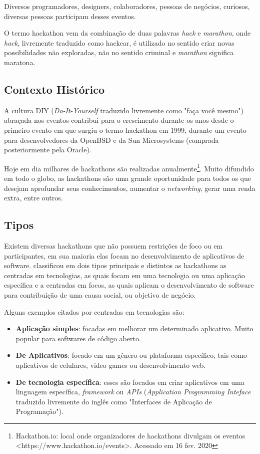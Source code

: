 Diversos programadores, designers, colaboradores, pessoas de negócios, curiosos, diversas pessoas participam desses eventos. 


O termo hackathon vem da combinação de duas palavras \textit{hack} e \textit{marathon}, onde \textit{hack}, livremente traduzido como hackear, é utilizado no sentido  criar novas possibilidades não exploradas, não no sentido criminal e \textit{marathon} significa maratona. \citep{briscoe2014digital}


\subsection{Contexto Histórico}
A cultura DIY (\textit{Do-It-Yourself} traduzido livremente como "faça você mesmo") abraçada nos eventos contribui para o crescimento durante os anos desde o primeiro evento em que surgiu o termo hackathon em 1999, durante um evento para desenvolvedores da OpenBSD e da Sun Microsystems (comprada posteriormente pela Oracle).\citep{briscoe2014digital}

Hoje em dia milhares de hackathons são realizadas anualmente\footnote{Hackathon.io: local onde organizadores de hackathons divulgam os eventos <https://www.hackathon.io/events>. Acessado em 16 fev. 2020}. Muito difundido em todo o globo, as hackathons são uma grande oportunidade para todos os que desejam aprofundar seus conhecimentos, aumentar o \textit{networking}, gerar uma renda extra, entre outros.

\subsection{Tipos}
Existem diversas hackathons que não possuem restrições de foco ou em participantes, em sua maioria elas focam no desenvolvimento de aplicativos de software. \citet{briscoe2014digital} classificou em dois tipos principais e distintos as hackathons as centradas em tecnologias, as quais focam em uma tecnologia ou uma aplicação específica e a centradas em focos, as quais aplicam o desenvolvimento de software para contribuição de uma causa social, ou objetivo de negócio.

Alguns exemplos citados por \citet{briscoe2014digital} centradas em tecnologias são:

\begin{itemize}
  \item \textbf{Aplicação simples}: focadas em melhorar um determinado aplicativo. Muito popular para softwares de código aberto.
  \item \textbf{De Aplicativos}: focado em um gênero ou plataforma específico, tais como aplicativos de celulares, video games ou desenvolvimento web.
  \item \textbf{De tecnologia específica}: esses são focados em criar aplicativos em uma linguagem específica, \textit{framework} ou \textit{APIs} (\textit{Application Programming Inteface} traduzido livremente do inglês como "Interfaces de Aplicação de Programação").
  
\end{itemize}

